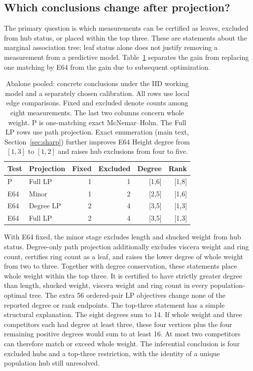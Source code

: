 \subsection{Which conclusions change after projection?}\label{sec:decision-application}
The primary question is which measurements can be certified as leaves, excluded from hub status, or placed within the top three. These are statements about the marginal association tree; leaf status alone does not justify removing a measurement from a predictive model. Table~\ref{tab:decision-abalone} separates the gain from replacing one matching by E64 from the gain due to subsequent optimization.


\begin{table}[H]\centering\small
\setlength{\tabcolsep}{4pt}
\caption{Abalone pooled: concrete conclusions under the IID working model and a separately chosen calibration. All rows use local edge comparisons. Fixed and excluded denote counts among eight measurements. The last two columns concern whole weight. P is one-matching exact McNemar--Holm. The Full LP rows use path projection. Exact enumeration (main text, Section~\ref{sec:sharp}) further improves E64 Height degree from $[1,3]$ to $[1,2]$ and raises hub exclusions from four to five.}\label{tab:decision-abalone}
\begin{lrbox}{\resultsbox}\begin{tabular}{llrrrr}
\toprule
Test & Projection & Fixed & Excluded & Degree & Rank\\
\midrule
P & Full LP & 1 & 1 & [1,6] & [1,8]\\
E64 & Minor & 1 & 2 & [2,5] & [1,6]\\
E64 & Degree LP & 2 & 4 & [3,5] & [1,3]\\
E64 & Full LP & 2 & 4 & [3,5] & [1,3]\\
\bottomrule\end{tabular}\end{lrbox}\ifdim\wd\resultsbox>\linewidth\resizebox{\linewidth}{!}{\usebox{\resultsbox}}\else\usebox{\resultsbox}\fi\end{table}


With E64 fixed, the minor stage excludes length and shucked weight from hub status. Degree-only path projection additionally excludes viscera weight and ring count, certifies ring count as a leaf, and raises the lower degree of whole weight from two to three. Together with degree conservation, these statements place whole weight within the top three. It is certified to have strictly greater degree than length, shucked weight, viscera weight and ring count in every population-optimal tree. The extra 56 ordered-pair LP objectives change none of the reported degree or rank endpoints. The top-three statement has a simple structural explanation. The eight degrees sum to 14. If whole weight and three competitors each had degree at least three, these four vertices plus the four remaining positive degrees would sum to at least 16. At most two competitors can therefore match or exceed whole weight. The inferential conclusion is four excluded hubs and a top-three restriction, with the identity of a unique population hub still unresolved.


